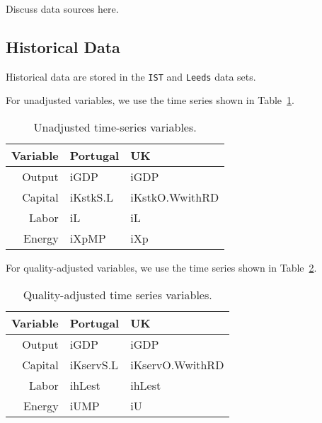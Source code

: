 \documentclass[preprint,authoryear,12pt]{elsarticle}\usepackage[]{graphicx}\usepackage[]{color}
\begin{document}
Discuss data sources here.


\subsection{Historical Data} 
\label{sec:Historical_Data}

Historical data are stored in the \texttt{IST} and \texttt{Leeds} data sets.





For unadjusted variables, we use the time series shown in Table~\ref{tab:unadjusted_variables}.

\begin{table} \caption{Unadjusted time-series variables.} 
\label{tab:unadjusted_variables} 
  \begin{center}
    \begin{tabular}{r l l} 
      \toprule
      Variable    & Portugal           & UK                 \\
      \midrule
      Output      & iGDP   
                                                             & iGDP\\
      Capital     & iKstkS.L & iKstkO.WwithRD \\
      Labor       & iL & iL \\
      Energy      & iXpMP & iXp \\
      \bottomrule
    \end{tabular}
  \end{center}
\end{table}

For quality-adjusted variables, we use the time series shown in Table~\ref{tab:quality_adjusted_variables}.

\begin{table} \caption{Quality-adjusted time series variables.} 
\label{tab:quality_adjusted_variables} 
  \begin{center}
    \begin{tabular}{r l l} 
      \toprule
      Variable    & Portugal         & UK               \\
      \midrule
      Output      & iGDP   
                                                           & iGDP \\
      Capital     & iKservS.L & iKservO.WwithRD \\
      Labor       & ihLest & ihLest \\
      Energy      & iUMP & iU \\
      \bottomrule
    \end{tabular}
  \end{center}
\end{table}
\end{document}

